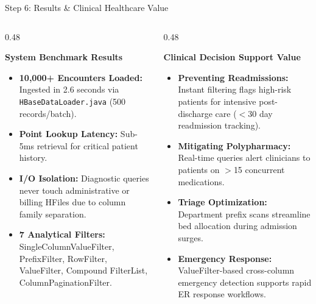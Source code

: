 \documentclass[aspectratio=169]{beamer}
\begin{document}
\begin{frame}{Step 6: Results \& Clinical Healthcare Value}
    \begin{columns}[T]
        \begin{column}{0.48\textwidth}
            \begin{block}{\textbf{System Benchmark Results}}
                \begin{itemize}\scriptsize
                    \item \textbf{10,000+ Encounters Loaded:} Ingested in 2.6 seconds via \texttt{HBaseDataLoader.java} (500 records/batch).
                    \item \textbf{Point Lookup Latency:} Sub-5ms retrieval for critical patient history.
                    \item \textbf{I/O Isolation:} Diagnostic queries never touch administrative or billing HFiles due to column family separation.
                    \item \textbf{7 Analytical Filters:} SingleColumnValueFilter, PrefixFilter, RowFilter, ValueFilter, Compound FilterList, ColumnPaginationFilter.
                \end{itemize}
            \end{block}
        \end{column}
        \begin{column}{0.48\textwidth}
            \begin{block}{\textbf{Clinical Decision Support Value}}
                \begin{itemize}\scriptsize
                    \item \textbf{Preventing Readmissions:} Instant filtering flags high-risk patients for intensive post-discharge care ($<$30 day readmission tracking).
                    \item \textbf{Mitigating Polypharmacy:} Real-time queries alert clinicians to patients on $>$15 concurrent medications.
                    \item \textbf{Triage Optimization:} Department prefix scans streamline bed allocation during admission surges.
                    \item \textbf{Emergency Response:} ValueFilter-based cross-column emergency detection supports rapid ER response workflows.
                \end{itemize}
            \end{block}
        \end{column}
    \end{columns}
\end{frame}
\end{document}
